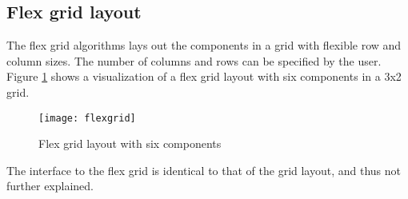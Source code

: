 \subsection{Flex grid layout}
The flex grid algorithms lays out the components in a grid with flexible row and column sizes. The number of columns and rows can be specified by the user. Figure \ref{flex-grid} shows a visualization of a flex grid layout with six components in a 3x2 grid. 

\begin{figure}[h]
\centering
\texttt{[image: flexgrid]}
\caption{Flex grid layout with six components}
\label{flex-grid}
\end{figure}

The interface to the flex grid is identical to that of the grid layout, and thus not further explained.
